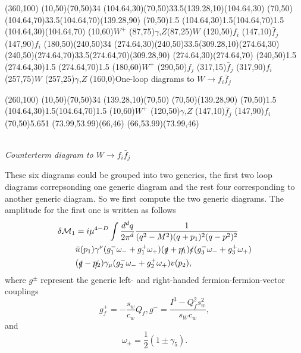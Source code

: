 \begin{axopicture}(360,100)
	\Photon(10,50)(70,50){3}{4}
	\Photon(104.64,30)(70,50){3}{3.5}\Line[arrow](139.28,10)(104.64,30)
	\Photon(70,50)(104.64,70){3}{3.5}\Line[arrow](104.64,70)(139.28,90)
	\Vertex(70,50){1.5}
	\Vertex(104.64,30){1.5}\Vertex(104.64,70){1.5}
	\Line[arrow](104.64,30)(104.64,70)	
	\Text(10,60){$W^+$}
	\Text(87,75){$\gamma$,$Z$}\Text(87,25){$W$}
	\Text(120,50){$f_i$}
	\Text(147,10){$\bar{f}_j$}
	\Text(147,90){$f_i$}
	\Photon(180,50)(240,50){3}{4}
	\Photon(274.64,30)(240,50){3}{3.5}\Line[arrow](309.28,10)(274.64,30)
	\Photon(240,50)(274.64,70){3}{3.5}\Line[arrow](274.64,70)(309.28,90)
	\Line[arrow](274.64,30)(274.64,70)	
	\Vertex(240,50){1.5}
	\Vertex(274.64,30){1.5}
	\Vertex(274.64,70){1.5}
	\Text(180,60){$W^+$}
	\Text(290,50){$f_j$}
	\Text(317,15){$\bar{f}_j$}
	\Text(317,90){$f_i$}
	\Text(257,75){$W$}
	\Text(257,25){$\gamma$,$Z$}
	\Text(160,0){One-loop diagrams to $W\to f_i\bar{f}_j$}
\end{axopicture}


\begin{center}
	\begin{axopicture}(260,100)
		\Photon(10,50)(70,50){3}{4}
		\Line[arrow](139.28,10)(70,50)
		\Line[arrow](70,50)(139.28,90)
		\Vertex(70,50){1.5}
		\Vertex(104.64,30){1.5}\Vertex(104.64,70){1.5}	
		\Text(10,60){$W^+$}
		\Text(120,50){$\gamma$,$Z$}
		\Text(147,10){$\bar{f}_j$}
		\Text(147,90){$f_i$}
		\GCirc(70,50){5.65}{1}
		\Line(73.99,53.99)(66,46)
		\Line(66,53.99)(73.99,46)
	\end{axopicture}
	\\ {\sl Counterterm diagram to $W\to f_i\bar{f}_j$}
\end{center}


These six diagrams could be grouped into two generics, the first two loop diagrams correpsonding one generic diagram and the rest four corresponding to another generic diagram. So we first compute the two generic diagrams. The amplitude for the first one is written as follows
\begin{align}
\delta\mathcal{M}_1&=i\mu^{4-D}\int\frac{d^dq}{{2\pi}^d}\frac{1}{(q^2-M^2)(q+p_1)^2(q-p^2)^2}\nonumber\\
&\bar{u}(p_1)\gamma^\nu(g^-_1\omega_-+g^+_1\omega_+)(\slashed{q}+\slashed{p_1})\slashed{\epsilon}(g^-_3\omega_-+g^+_3\omega_+)\nonumber\\
&(\slashed{q}-\slashed{p_2})\gamma_\mu(g^-_2\omega_-+g^+_2\omega_+)v(p_2),
\end{align} 
where $g^\pm$ represent the generic left- and right-handed fermion-fermion-vector couplings
\begin{equation}
g^+_f=-\frac{s_w}{c_w}Q_f, g^-=\frac{I^3-Q_f^2s_w^2}{s_Wc_w},
\end{equation}
and
\begin{equation}
\omega_\pm=\frac{1}{2}(1\pm\gamma_5).
\end{equation}

